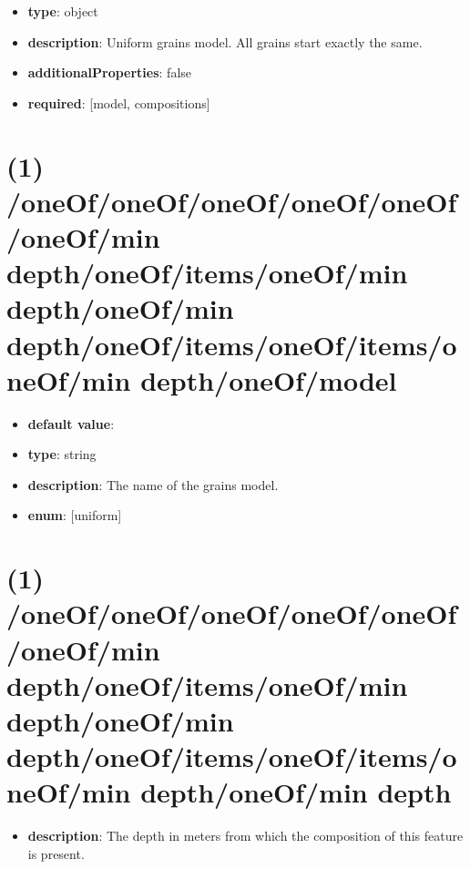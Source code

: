 \begin{itemize}[leftmargin=0em]\item {\bf type}: object
\item {\bf description}: Uniform grains model. All grains start exactly the same.
\item {\bf additionalProperties}: false
\item {\bf required}: [model, compositions]\end{itemize}
\section{(1) /oneOf/oneOf/oneOf/oneOf/oneOf/oneOf/min depth/oneOf/items/oneOf/min depth/oneOf/min depth/oneOf/items/oneOf/items/oneOf/min depth/oneOf/model}
\begin{itemize}[leftmargin=1em]\item {\bf default value}: 
\item {\bf type}: string
\item {\bf description}: The name of the grains model.
\item {\bf enum}: [uniform]\end{itemize}\section{(1) /oneOf/oneOf/oneOf/oneOf/oneOf/oneOf/min depth/oneOf/items/oneOf/min depth/oneOf/min depth/oneOf/items/oneOf/items/oneOf/min depth/oneOf/min depth}
\begin{itemize}[leftmargin=1em]\item {\bf description}: The depth in meters from which the composition of this feature is present.
\end{itemize}
